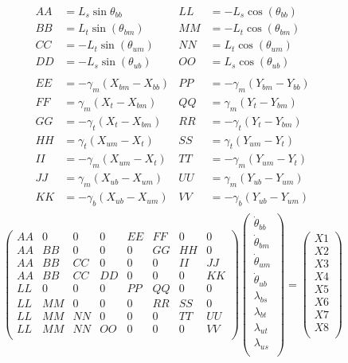 \documentclass[10pt]{article} %
\begin{document}
\begin{align*}
AA &= L_s\sin\theta_{bb}      &   LL &= -L_s\cos(\theta_{bb})\\
BB &= L_t\sin(\theta_{bm})    &	 MM &= -L_t\cos(\theta_{bm})\\
CC &= -L_t\sin(\theta_{um})   &	 NN &= L_t\cos(\theta_{um})\\
DD &= -L_s\sin(\theta_{ub})   &	 OO &= L_s\cos(\theta_{ub})\\
\\
EE &= -\gamma_m (X_{bm} - X_{bb})       &  PP &= -\gamma_m (Y_{bm} - Y_{bb})\\
FF &= \gamma_m (X_{t } - X_{bm})        &	 QQ &= \gamma_m (Y_{t } - Y_{bm})\\ 
GG &= -\gamma_t (X_{t } - X_{bm})       &	 RR &= -\gamma_t (Y_{t } - Y_{bm})\\
HH &= \gamma_t (X_{um} - X_{t })        &	 SS &= \gamma_t (Y_{um} - Y_{t })\\ 
II &= -\gamma_m (X_{um} - X_{t })       &	 TT &= -\gamma_m (Y_{um} - Y_{t })\\
JJ &= \gamma_m (X_{ub} - X_{um})        &	 UU &= \gamma_m (Y_{ub} - Y_{um})\\ 
KK &= -\gamma_b (X_{ub} - X_{um})       &	 VV &= -\gamma_b (Y_{ub} - Y_{um})\\
\end{align*}%
%
\[
\begin{pmatrix}
  AA & 0 & 0 & 0 & EE & FF & 0 & 0\\
  AA & BB & 0 & 0 & 0 & GG & HH & 0\\
  AA & BB & CC & 0 & 0 & 0 & II & JJ\\
  AA & BB & CC & DD & 0 & 0 & 0 & KK\\
  LL & 0 & 0 & 0 & PP & QQ & 0 & 0\\
  LL & MM & 0 & 0 & 0 & RR & SS & 0\\
  LL & MM & NN & 0 & 0 & 0 & TT & UU\\
  LL & MM & NN & OO & 0 & 0 & 0 & VV\\
\end{pmatrix}
\begin{pmatrix}
    \dot{\theta}_{bb}\\
    \dot{\theta}_{bm}\\
    \dot{\theta}_{um}\\
    \dot{\theta}_{ub}\\
    \lambda_{bs}\\
    \lambda_{bt}\\
    \lambda_{ut}\\
    \lambda_{us}\\
  \end{pmatrix}
=
\begin{pmatrix}
  X1\\
  X2\\
  X3\\
  X4\\
  X5\\
  X6\\
  X7\\
  X8\\
\end{pmatrix}
\]
\end{document}
